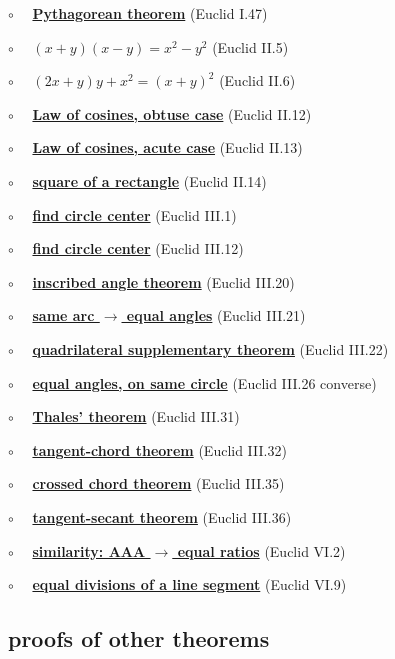 \documentclass[11pt, oneside]{article}
\begin{document}
$\circ$ \ \ \hyperref[sec:Euclid_I_47]{\textbf{Pythagorean theorem}} (Euclid I.47)

$\circ$ \ \ \hyperref[sec:Euclid_II_5]{\textbf{$(x+y)(x-y)=x^2 - y^2$}} (Euclid II.5)

$\circ$ \ \ \hyperref[sec:Euclid_II_6]{\textbf{$(2x + y) y + x^2 = (x + y)^2$}} (Euclid II.6)

$\circ$ \ \ \hyperref[sec:law_of_cosines]{\textbf{Law of cosines, obtuse case}} (Euclid II.12)

$\circ$ \ \ \hyperref[sec:law_of_cosines]{\textbf{Law of cosines, acute case}} (Euclid II.13)

$\circ$ \ \ \hyperref[sec:Euclid_II_14]{\textbf{square of a rectangle}} (Euclid II.14)

$\circ$ \ \ \hyperref[sec:find_circle_center]{\textbf{find circle center}} (Euclid III.1)

$\circ$ \ \ \hyperref[sec:Euclid_III_12]{\textbf{find circle center}} (Euclid III.12)

$\circ$ \ \ \hyperref[sec:inscribed_angle_theorem]{\textbf{inscribed angle theorem}} (Euclid III.20)

$\circ$ \ \ \hyperref[sec:angles_on_same_arc]{\textbf{same arc $\rightarrow$ equal angles}} (Euclid III.21)

$\circ$ \ \ \hyperref[sec:quadrilateral_supplementary]{\textbf{quadrilateral supplementary theorem}} (Euclid III.22)

$\circ$ \ \ \hyperref[sec:equal_angle_on_circle_contradiction]{\textbf{equal angles, on same circle}} (Euclid III.26 converse)

$\circ$ \ \ \hyperref[sec:Thales_theorem]{\textbf{Thales' theorem}} (Euclid III.31)

$\circ$ \ \ \hyperref[sec:tangent_chord_theorem]{\textbf{tangent-chord theorem}} (Euclid III.32)

$\circ$ \ \ \hyperref[sec:Euclid_III_35]{\textbf{crossed chord theorem}} (Euclid III.35)

$\circ$ \ \ \hyperref[sec:tangent_secant_theorem]{\textbf{tangent-secant theorem}} (Euclid III.36)

$\circ$ \ \ \hyperref[sec:Euclid_VI_2]{\textbf{similarity:  AAA $\rightarrow$ equal ratios}} (Euclid VI.2)

$\circ$ \ \ \hyperref[sec:Euclid_VI_9]{\textbf{equal divisions of a line segment}} (Euclid VI.9)


\subsection*{proofs of other theorems}
\end{document}
